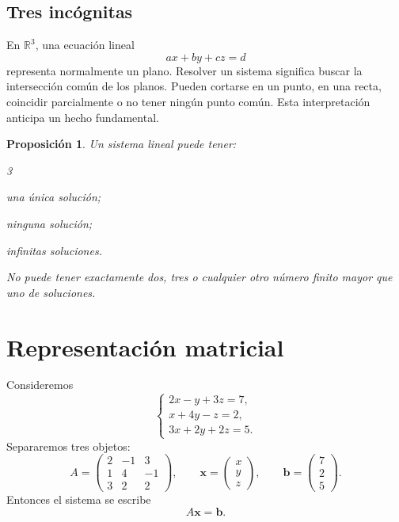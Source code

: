\documentclass[12pt]{article}
\newtheorem{proposicion}[definicion]{Proposición}
\theoremstyle{remark}
\newcommand{\R}{\mathbb{R}}
\begin{document}
\subsection*{Tres incógnitas}
En $\R^3$, una ecuación lineal
\[
ax+by+cz=d
\]
representa normalmente un plano. Resolver un sistema significa buscar la intersección común de los planos. Pueden cortarse en un punto, en una recta, coincidir parcialmente o no tener ningún punto común. Esta interpretación anticipa un hecho fundamental.

\begin{proposicion}
Un sistema lineal puede tener:
\begin{itemize}
\begin{multicols}{3}
\item una única solución;
\item ninguna solución;
\item infinitas soluciones.
\end{multicols}
\end{itemize}
No puede tener exactamente dos, tres o cualquier otro número finito mayor que uno de soluciones.
\end{proposicion}

\section{Representación matricial}
Consideremos
\[
\begin{cases}
2x-y+3z=7,\\
x+4y-z=2,\\
3x+2y+2z=5.
\end{cases}
\]
Separaremos tres objetos:
\[
A=
\begin{pmatrix}
2&-1&3\\
1&4&-1\\
3&2&2
\end{pmatrix},
\qquad
\mathbf{x}=
\begin{pmatrix}x\\y\\z\end{pmatrix},
\qquad
\mathbf{b}=
\begin{pmatrix}7\\2\\5\end{pmatrix}.
\]
Entonces el sistema se escribe
\[
A\mathbf{x}=\mathbf{b}.
\]
\end{document}
